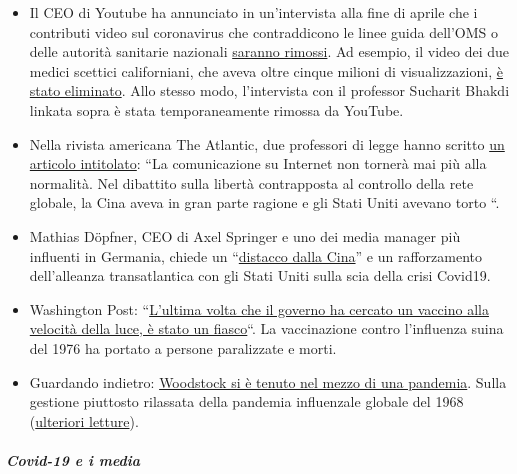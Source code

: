 \begin{itemize}
\tightlist
\item
  Il CEO di Youtube ha annunciato in un'intervista alla fine di aprile
  che i contributi video sul coronavirus che contraddicono le linee
  guida dell'OMS o delle autorità sanitarie nazionali
  \href{https://www.businessinsider.com/youtube-will-ban-anything-against-who-guidance-2020-4}{saranno
  rimossi}. Ad esempio, il video dei due medici scettici californiani,
  che aveva oltre cinque milioni di visualizzazioni,
  \href{https://www.turnto23.com/news/coronavirus/video-interview-with-dr-dan-erickson-and-dr-artin-massihi-taken-down-from-youtube}{è
  stato eliminato}. Allo stesso modo, l'intervista con il professor
  Sucharit Bhakdi linkata sopra è stata temporaneamente rimossa da
  YouTube.
\item
  Nella rivista americana The Atlantic, due professori di legge hanno
  scritto
  \href{https://www.theatlantic.com/ideas/archive/2020/04/what-covid-revealed-about-internet/610549/}{un
  articolo intitolato}: ``La comunicazione su Internet non tornerà mai
  più alla normalità. Nel dibattito sulla libertà contrapposta al
  controllo della rete globale, la Cina aveva in gran parte ragione e
  gli Stati Uniti avevano torto ``.
\item
  Mathias Döpfner, CEO di Axel Springer e uno dei media manager più
  influenti in Germania, chiede un
  ``\href{https://www.german-foreign-policy.com/news/detail/8263/}{distacco
  dalla Cina}'' e un rafforzamento dell'alleanza transatlantica con gli
  Stati Uniti sulla scia della crisi Covid19.
\item
  Washington Post:
  ``\href{https://www.washingtonpost.com/history/2020/05/01/vaccine-swine-flu-coronavirus/}{L'ultima
  volta che il governo ha cercato un vaccino alla velocità della luce, è
  stato un fiasco}``. La vaccinazione contro l'influenza suina del 1976
  ha portato a persone paralizzate e morti.
\item
  Guardando indietro:
  \href{https://www.aier.org/article/woodstock-occurred-in-the-middle-of-a-pandemic/}{Woodstock
  si è tenuto nel mezzo di una pandemia}. Sulla gestione piuttosto
  rilassata della pandemia influenzale globale del 1968
  (\href{https://www.britannica.com/event/Hong-Kong-flu-of-1968}{ulteriori
  letture}).
\end{itemize}

\hypertarget{covid-19-e-i-media}{%
\subparagraph{\texorpdfstring{\textbf{Covid-19 e i
media}}{Covid-19 e i media}}\label{covid-19-e-i-media}}

